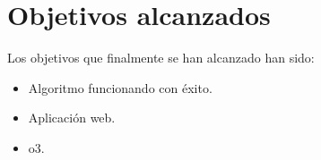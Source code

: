 \section{Objetivos alcanzados}\label{objetivos-alcanzados}
Los objetivos que finalmente se han alcanzado han sido: 
\begin{itemize}
\tightlist
\item
  Algoritmo funcionando con éxito.
\item
  Aplicación web. 
\item
  o3.
\end{itemize}
